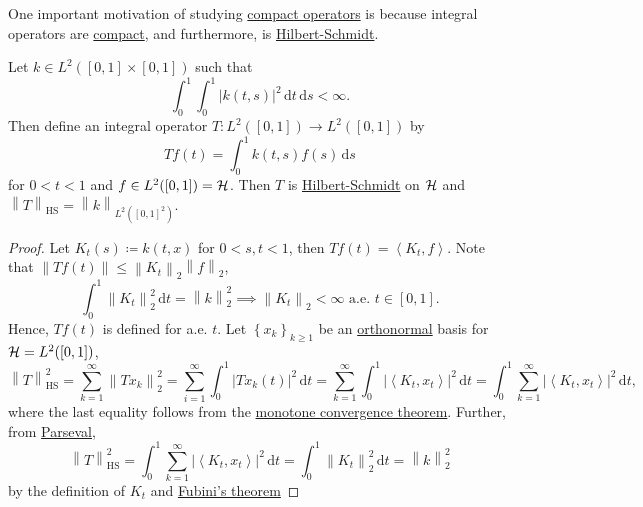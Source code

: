 One important motivation of studying \hyperref[def:compact-op]{compact operators} is because integral operators are \hyperref[def:compact-op]{compact}, and furthermore, is \hyperref[def:Hilbert-Schmidt-op]{Hilbert-Schmidt}.
\begin{proposition}\label{prop:Hilbert-Schmidt-integral-op}
	Let \(k\in L^2([0, 1]\times [0, 1])\) such that
	\[
		\int _0^1 \int _0^1 \left\vert k(t, s) \right\vert ^{2} \,\mathrm{d} t\,\mathrm{d} s < \infty.
	\]
	Then define an integral operator \(T\colon L^2([0, 1])\to L^2([0, 1])\) by
	\[
		Tf(t) = \int _0^1 k(t, s)f(s)\,\mathrm{d} s
	\]
	for \(0 < t < 1\) and \(f\in L^2([0, 1])= \mathcal{\MakeUppercase{h}} \). Then \(T\) is \hyperref[def:Hilbert-Schmidt-op]{Hilbert-Schmidt} on \(\mathcal{\MakeUppercase{h}} \) and \(\left\lVert T\right\rVert _{\mathrm{HS} }= \left\lVert k\right\rVert _{L^2([0, 1]^2)}\).
\end{proposition}
\begin{proof}
	Let \(K_t(s) \coloneqq k(t, x)\) for \(0<s, t<1\), then \(Tf(t) = \left\langle K_t, f \right\rangle \). Note that \(\left\lVert Tf(t)\right\rVert \leq \left\lVert K_t\right\rVert _2 \left\lVert f\right\rVert _2\),
	\[
		\int_{0}^{1} \left\lVert K_t\right\rVert ^2_2 \,\mathrm{d}t = \left\lVert k\right\rVert _2^2 \implies \left\lVert K_t\right\rVert _2<\infty \text{ a.e. }t\in [0,1].
	\]
	Hence, \(Tf(t)\) is defined for a.e. \(t\). Let \(\left\{ x_k \right\} _{k \geq 1}\) be an \hyperref[def:orthonormal-system]{orthonormal} basis for \(\mathcal{\MakeUppercase{h}} =L^2([0, 1])\),
	\[
		\left\lVert T\right\rVert ^2 _{\mathrm{HS} }
		= \sum_{k=1}^{\infty} \left\lVert T x_{k} \right\rVert _2^2
		= \sum_{i=1}^{\infty} \int _0^1 \left\vert T x_{k} (t) \right\vert ^2 \,\mathrm{d} t
		= \sum_{k=1}^{\infty} \int _0^1 \left\vert \left\langle K_{t} , x_{t}  \right\rangle  \right\vert ^2 \,\mathrm{d} t
		= \int _0^1 \sum_{k=1}^{\infty}\left\vert \left\langle K_{t} , x_{t}  \right\rangle  \right\vert ^2 \,\mathrm{d} t ,
	\]
	where the last equality follows from the \href{https://en.wikipedia.org/wiki/Monotone_convergence_theorem}{monotone convergence theorem}. Further, from \hyperref[col:Parseval]{Parseval},
	\[
		\left\lVert T\right\rVert ^2 _{\mathrm{HS} }
		= \int _0^1 \sum_{k=1}^{\infty}\left\vert \left\langle K_{t} , x_{t}  \right\rangle  \right\vert ^2 \,\mathrm{d} t
		= \int _0^1 \left\lVert K_t\right\rVert _2^2 \,\mathrm{d} t
		= \left\lVert k\right\rVert _2^2
	\]
	by the definition of \(K_t\) and \href{https://en.wikipedia.org/wiki/Fubini's_theorem}{Fubini's theorem}
\end{proof}

